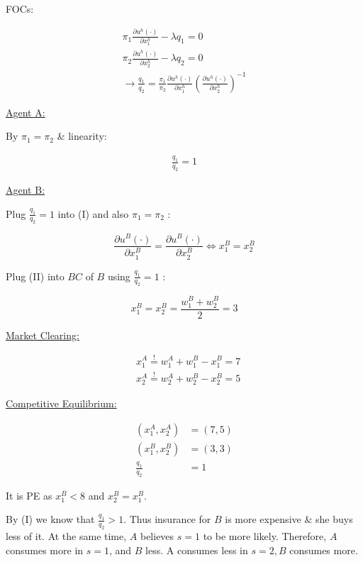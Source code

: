 {\begin{enumerate}[label=(\alph*)]
{FOCs:

\begin{align*}
    \pi_{1} \frac{\partial u^{h}(\cdot)}{\partial x_{1}^{h}}-\lambda q_{1}=0 \\
    \pi_{2} \frac{\partial u^{h}(\cdot)}{\partial x_{2}^{h}}-\lambda q_{2}=0 \\
    \longrightarrow \frac{q_{1}}{q_{2}}=\frac{\pi_{1}}{\pi_{2}} \frac{\partial u^{h}(\cdot)}{\partial x_{1}^{h}}\left(\frac{\partial u^{h}(\cdot)}{\partial x_{2}^{h}}\right)^{-1} \tag{I}
\end{align*}

\underline{Agent A:}

By $\pi_{1}=\pi_{2}$ \& linearity:

\begin{align*}
    \frac{q_{1}}{q_{2}}=1
\end{align*}

\underline{Agent B:}

Plug $\frac{q_{1}}{q_{2}}=1$ into (I) and also $\pi_{1}=\pi_{2}$ :

\begin{equation*}
    \frac{\partial u^{B}(\cdot)}{\partial x_{1}^{B}}=\frac{\partial u^{B}(\cdot)}{\partial x_2^{B}} \Leftrightarrow x_{1}^{B}=x_{2}^{B} \tag{II}
\end{equation*}

Plug (II) into $B C$ of $B$ using $\frac{q_{1}}{q_{2}}=1$ :

$$
x_{1}^{B}=x_{2}^{B}=\frac{w_{1}^{B}+w_{2}^{B}}{2}=3
$$

\underline{Market Clearing: }

$$
\begin{aligned}
& x_{1}^{A} \stackrel{!}{=} w_{1}^{A}+w_{1}^{B}-x_{1}^{B}=7 \\
& x_{2}^{A} \stackrel{!}{=} w_{2}^{A}+w_{2}^{B}-x_{2}^{B}=5
\end{aligned}
$$

\underline{Competitive Equilibrium: }

$$
\begin{aligned}
\left(x_{1}^{A}, x_{2}^{A}\right) & =(7,5) \\
\left(x_{1}^{B}, x_{2}^{B}\right) & =(3,3) \\
\frac{q_{1}}{q_2} & =1
\end{aligned}
$$

It is PE as $x_{1}^{B}<8$ and $x_{2}^{B}=x_{1}^{B}$.
}
{\item 
By (I) we know that $\frac{q_{1}}{q_{2}}>1$. Thus insurance for $B$ is more expensive $\&$ she buys less of it. At the same time, $A$ believes $s=1$ to be more likely. Therefore, $A$ consumes more in $s=1$, and $B$ less. A consumes less in $s=2, B$ consumes more.
}
\end{enumerate}
}